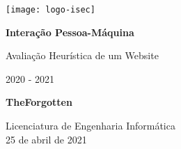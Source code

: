 \begin{titlepage}
	\begin{center}
		\texttt{[image: logo-isec]}
		
		\vspace*{\fill}
		
		\Huge
		\textbf{Interação Pessoa-Máquina}
		
		\huge
		Avaliação Heurística de um Website
		
		\vspace{0.5cm}
		\LARGE
		2020 - 2021
		
		\vspace{1.5cm}
		
		\textbf{TheForgotten}
		
		\vfill
		\vspace*{\fill}
		
		\normalsize
		Licenciatura de Engenharia Informática \\
		25 de abril de 2021		
	\end{center}
\end{titlepage}